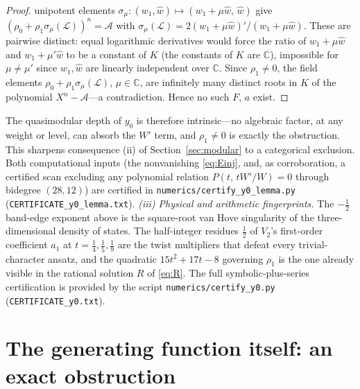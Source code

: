 \documentclass[cntp]{ipart}
\theoremstyle{plain}
\theoremstyle{remark}
\begin{document}
\begin{proof}
unipotent elements $\sigma_\mu:(w_1,\hat w)\mapsto(w_1+\mu \hat w,\,\hat w)$ give
$(\rho_0+\rho_1\sigma_\mu(\mathcal{L}))^n=\mathcal{A}$ with
$\sigma_\mu(\mathcal{L})=2(w_1+\mu \hat w)'/(w_1+\mu \hat w)$. These are pairwise distinct: equal
logarithmic derivatives would force the ratio of $w_1+\mu \hat w$ and $w_1+\mu'\hat w$ to be a
constant of $K$ (the constants of $K$ are $\mathbb{C}$), impossible for $\mu\neq\mu'$ since
$w_1,\hat w$ are linearly independent over $\mathbb{C}$. Since $\rho_1\neq0$, the field elements
$\rho_0+\rho_1\sigma_\mu(\mathcal{L})$, $\mu\in\mathbb{C}$, are infinitely many distinct roots
in $K$ of the polynomial $X^n-\mathcal{A}$---a contradiction. Hence no such $F$, $a$ exist.
\end{proof}

The quasimodular depth of $y_0$ is therefore intrinsic---no algebraic factor, at any weight or
level, can absorb the $W'$ term, and $\rho_1\neq0$ is exactly the obstruction. This sharpens
consequence (ii) of Section~\ref{sec:modular} to a categorical exclusion. Both
computational inputs (the nonvanishing \eqref{eq:Einj}, and, as corroboration, a certified
scan excluding any polynomial relation $P(t,\,tW'/W)=0$ through bidegree $(28,12)$) are
certified in \texttt{numerics/certify\_y0\_lemma.py}
(\texttt{CERTIFICATE\_y0\_lemma.txt}).
\emph{(iii) Physical and arithmetic fingerprints.} The $-\tfrac12$ band-edge exponent above is
the square-root van Hove singularity of the three-dimensional density of states. The
half-integer residues $\tfrac12$ of $V_2$'s first-order coefficient $a_1$ at
$t=\tfrac14,\tfrac15,\tfrac19$ are the twist multipliers that defeat every trivial-character
ansatz, and the quadratic $15t^2+17t-8$ governing $\rho_1$ is the one already visible in the
rational solution $R$ of \eqref{eq:R}. The full
symbolic-plus-series certification is provided by the script \texttt{numerics/certify\_y0.py}
(\texttt{CERTIFICATE\_y0.txt}).

\section{The generating function itself: an exact obstruction}
\label{sec:phiobs}
\end{document}
